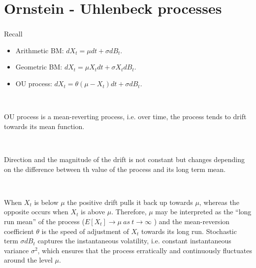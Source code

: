 \documentclass[c, dvipsnames, 8pt]{beamer}
\begin{document}
\section{Ornstein - Uhlenbeck processes}




\begin{frame}[shrink=5]
	\frametitle{\insertsection} 
	
	
	Recall 
	
\begin{itemize}
	\item 	Arithmetic BM:  	$dX_t = \mu dt + \sigma d B_t$.
	\item 	Geometric BM:  	$dX_t = \mu X_t dt + \sigma X_t d B_t$.
	\item 	OU process:  	$dX_t = \theta ( \mu  - X_t)  dt + \sigma  d B_t$.
\end{itemize}	


\


OU process is a  mean-reverting process, i.e.  over time, the process tends to drift towards its mean function. 

\

Direction and the magnitude of the drift is not constant but changes depending on the difference between th value of the process and its long term mean.

\

When $X_t$ is below $\mu$ the positive drift pulls it back up towards $\mu$, whereas the opposite occurs when $X_t$ is above $\mu$.  Therefore, 
$\mu$  may be
interpreted as the ``long run mean'' of the process ($E[X_t] \to \mu \ as \  t \to \infty$ )
and the mean-reversion coefficient $\theta$  is the speed of adjustment of $X_t$ towards its long run.
Stochastic term $\sigma d B_t$ captures the instantaneous volatility, i.e. constant instantaneous variance $\sigma^2$, which ensures that the process erratically and continuously fluctuates around the level $\mu$.





\


\end{frame}
\end{document}

